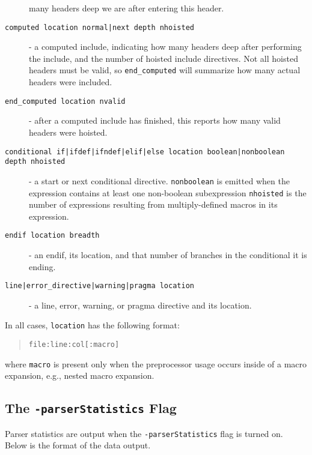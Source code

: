 \documentclass{article}
\begin{document}
\begin{description}
  many headers deep we are after entering this header.
\item[\texttt{computed location normal|next depth nhoisted}] - a computed
  include, indicating how many headers deep after performing the
  include, and the number of hoisted include directives.  Not all
  hoisted headers must be valid, so \verb"end_computed" will summarize how
  many actual headers were included.
\item[\texttt{end\_computed location nvalid}] - after a computed include has
  finished, this reports how many valid headers were hoisted.
\item[\texttt{conditional if|ifdef|ifndef|elif|else location
  boolean|nonboolean depth nhoisted}] - a start or next conditional
  directive. \verb"nonboolean" is emitted when the expression contains at
  least one non-boolean subexpression \verb"nhoisted" is the number of
  expressions resulting from multiply-defined macros in its
  expression.
\item[\texttt{endif location breadth}] - an endif, its location, and that
  number of branches in the conditional it is ending.
\item[\texttt{line|error\_directive|warning|pragma location}] - a line, error, warning,
  or pragma directive and its location.
\end{description}

In all cases, \verb"location" has the following format:

\begin{quote}
\verb"file:line:col[:macro]"
\end{quote}

where \verb"macro" is present only when the preprocessor usage occurs
inside of a macro expansion, e.g., nested macro expansion.

\subsection{The \texttt{-parserStatistics} Flag}

Parser statistics are output when the \verb"-parserStatistics" flag is
turned on.  Below is the format of the data output.
\end{document}

